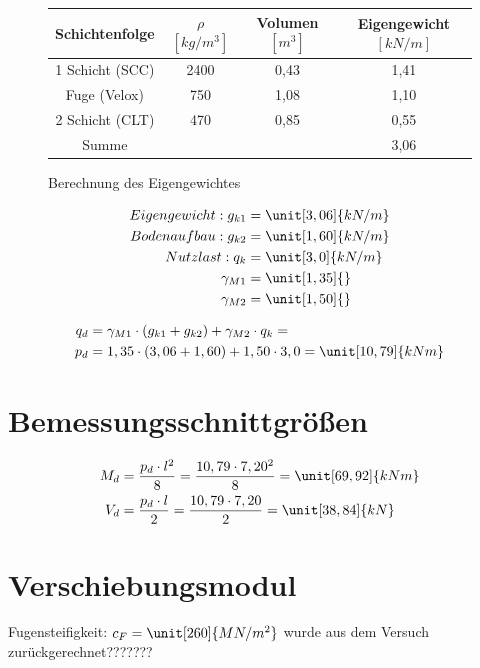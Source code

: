 \begin{figure}[h!]
\caption{Berechnung des Eigengewichtes}
\begin{center}
\begin{tabular}{|c|c|c|c|}
\hline 
Schichtenfolge & $\rho$ $[kg/m^{3}]$ & Volumen $[m^{3}]$ &  Eigengewicht $[kN/m] $\\ 
\hline 
 1 Schicht (SCC) & 2400 & 0,43 & 1,41 \\ 
\hline 
Fuge (Velox) & 750 & 1,08 & 1,10 \\ 
\hline 
2 Schicht (CLT) & 470 & 0,85 & 0,55 \\ 
\hline\hline 
Summe &  &  & 3,06 \\ 
\hline 
\end{tabular} 
\end{center}
\end{figure}

\begin{align*}
Eigengewicht: g_{k1}&=\unit[3,06]{kN/m}\\
Bodenaufbau: g_{k2}&= \unit[1,60]{kN/m}\\
Nutzlast:q_{k}&=\unit[3,0]{kN/m}\\
\gamma_{M1}&=\unit[1,35]{} \\
\gamma_{M2}&=\unit[1,50]{} \\
 \end{align*}

\begin{align*}
q_{d}&= \gamma_{M1} \cdot (g_{k1}+g_{k2})+\gamma_{M2} \cdot q_{k}=\\
p_{d}&=1,35 \cdot (3,06 + 1,60)+1,50 \cdot 3,0=\unit[10,79]{kNm}
\end{align*}
\section{Bemessungsschnittgrößen}
\begin{align*}
M_{d}&=\dfrac{p_{d} \cdot l^{2}}{8}=\dfrac{10,79 \cdot 7,20^{2}}{8}= \unit[69,92]{kNm}\\
V_{d}&=\dfrac{p_{d} \cdot l}{2}=\dfrac{10,79 \cdot 7,20}{2}=\unit[38,84]{kN}
\end{align*}

\section{Verschiebungsmodul}

Fugensteifigkeit: $c_{F}=\unit[260]{MN/m^{2}}$ wurde aus dem Versuch zurückgerechnet???????

